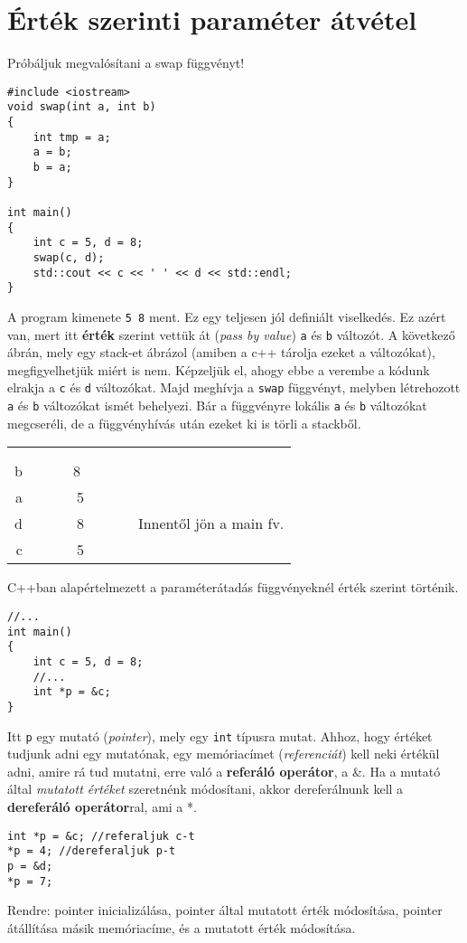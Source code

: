 \documentclass[a4paper,11.5pt]{article}
\begin{document}
	\section{Érték szerinti paraméter átvétel}
	Próbáljuk megvalósítani a swap függvényt!
		\begin{lstlisting}
#include <iostream>
void swap(int a, int b)
{
	int tmp = a;
	a = b;
	b = a;
}

int main()
{
	int c = 5, d = 8;
	swap(c, d);
	std::cout << c << ' ' << d << std::endl;
}
		\end{lstlisting}		
		A program kimenete \texttt{5 8} ment. Ez egy teljesen jól definiált viselkedés. Ez azért van, mert itt \textbf{érték} szerint vettük át (\textit{pass by value}) \texttt{a} és \texttt{b} változót. A következő ábrán, mely egy stack-et ábrázol (amiben a c++ tárolja ezeket a változókat), megfigyelhetjük miért is nem. Képzeljük el, ahogy ebbe a verembe a kódunk elrakja a \texttt{c} és \texttt{d} változókat. Majd meghívja a \texttt{swap} függvényt, melyben létrehozott \texttt{a} és \texttt{b} változókat ismét behelyezi. Bár a függvényre lokális \texttt{a} és \texttt{b} változókat megcseréli, de a függvényhívás után ezeket ki is törli a stackből.
		\begin{center}
			\begin{tabular}{r|c|l}
				&&\\
				&&\\
				\cline{2-2}
				b&~~~~~8~~~~~~&\\
				\cline{2-2}
				a&5&\\
				\cline{2-2}
				\hline
				\hline
				d&8& Innentől jön a main fv.\\
				\cline{2-2}
				c&5&\\
				\cline{2-2}
			\end{tabular}
		\end{center}
		C++ban alapértelmezett a paraméterátadás függvényeknél érték szerint történik.
		
		\begin{lstlisting}
//...
int main()
{
	int c = 5, d = 8;
	//...
	int *p = &c;
}
		\end{lstlisting}
		Itt \texttt{p} egy mutató (\textit{pointer}), mely egy \texttt{int} típusra mutat. Ahhoz, hogy értéket tudjunk adni egy mutatónak, egy memóriacímet (\textit{referenciát}) kell neki értékül adni, amire rá tud mutatni, erre való a \textbf{referáló operátor}, a \&. Ha a mutató által \textit{mutatott értéket} szeretnénk módosítani, akkor dereferálnunk kell a \textbf{dereferáló operátor}ral, ami a *.
		\begin{lstlisting}
int *p = &c; //referaljuk c-t
*p = 4; //dereferaljuk p-t
p = &d;
*p = 7;
		\end{lstlisting}
		Rendre: pointer inicializálása, pointer által mutatott érték módosítása, pointer átállítása másik memóriacíme, és a mutatott érték módosítása.
		
\end{document}
